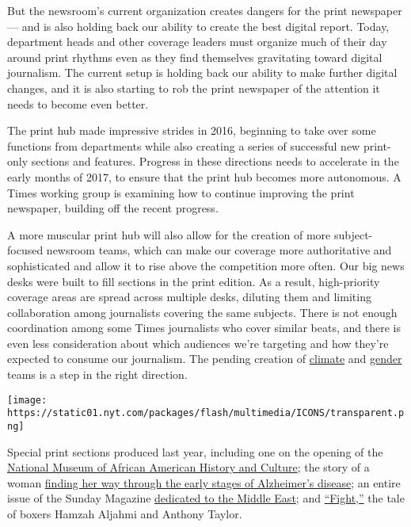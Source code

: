 But the newsroom's current organization creates dangers for the print
newspaper --- and is also holding back our ability to create the best
digital report. Today, department heads and other coverage leaders must
organize much of their day around print rhythms even as they find
themselves gravitating toward digital journalism. The current setup is
holding back our ability to make further digital changes, and it is also
starting to rob the print newspaper of the attention it needs to become
even better.

The print hub made impressive strides in 2016, beginning to take over
some functions from departments while also creating a series of
successful new print-only sections and features. Progress in these
directions needs to accelerate in the early months of 2017, to ensure
that the print hub becomes more autonomous. A Times working group is
examining how to continue improving the print newspaper, building off
the recent progress.

A more muscular print hub will also allow for the creation of more
subject-focused newsroom teams, which can make our coverage more
authoritative and sophisticated and allow it to rise above the
competition more often. Our big news desks were built to fill sections
in the print edition. As a result, high-priority coverage areas are
spread across multiple desks, diluting them and limiting collaboration
among journalists covering the same subjects. There is not enough
coordination among some Times journalists who cover similar beats, and
there is even less consideration about which audiences we're targeting
and how they're expected to consume our journalism. The pending creation
of
\href{https://www.nytimes.com/interactive/2016/jobs/nyt-climate-change-editor.html}{climate}
and
\href{https://www.nytimes.com/interactive/2016/jobs/nyt-gender-editor.html}{gender}
teams is a step in the right direction.

\texttt{[image: https://static01.nyt.com/packages/flash/multimedia/ICONS/transparent.png]}

Special print sections produced last year, including one on the opening
of the
\href{https://www.nytimes.com/interactive/2016/09/15/arts/design/national-museum-of-african-american-history-and-culture.html}{National
Museum of African American History and Culture}; the story of a woman
\href{https://www.nytimes.com/interactive/2016/05/01/nyregion/living-with-alzheimers.html}{finding
her way through the early stages of Alzheimer's disease}; an entire
issue of the Sunday Magazine
\href{https://www.nytimes.com/interactive/2016/08/11/magazine/isis-middle-east-arab-spring-fractured-lands.html}{dedicated
to the Middle East}; and
\href{https://www.nytimes.com/2016/03/28/sports/boxing-youngstown-anthony-taylor-hamzah-aljahmi.html}{``Fight,''}
the tale of boxers Hamzah Aljahmi and Anthony Taylor.


